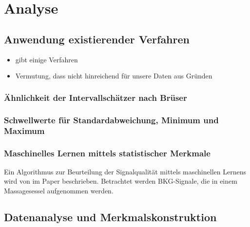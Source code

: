 \chapter{Analyse}\label{analyse}


\section{Anwendung existierender Verfahren}

\begin{itemize}
	\item gibt einige Verfahren
	\item Vermutung, dass nicht hinreichend für unsere Daten	 aus Gründen
\end{itemize}

\subsection{Ähnlichkeit der Intervallschätzer nach Brüser}

\subsection{Schwellwerte für Standardabweichung, Minimum und Maximum}

\subsection{Maschinelles Lernen mittels statistischer Merkmale}

Ein Algorithmus zur Beurteilung der Signalqualität mittels maschinellen Lernens wird von \citeauthor{Sadek2016} im Paper  beschrieben. Betrachtet werden \ac{BKG}-Signale, die in einem Massagesessel aufgenommen werden.

\section{Datenanalyse und Merkmalskonstruktion}


